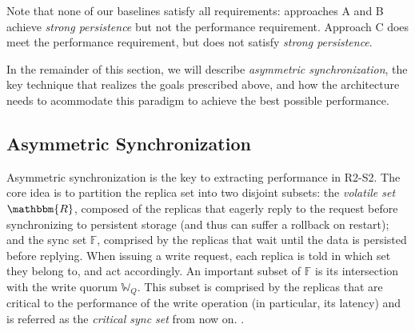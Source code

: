 Note that none of our baselines satisfy all requirements:
approaches A and B achieve
\emph{strong persistence} but not the performance requirement.
Approach C does meet the performance
requirement, but does not satisfy \emph{strong persistence}.

In the remainder of this section, we will describe
\emph{asymmetric synchronization}, the key technique that realizes the
goals prescribed above, and how the architecture needs to
acommodate this paradigm to achieve the best possible
performance.

\subsection{Asymmetric Synchronization}\label{ssec:asymmetric_synchronization}

Asymmetric synchronization is the key to extracting performance
in \ac{R2-S2}. The core idea is to partition the replica set
into two disjoint subsets: the \emph{volatile set}
$\mathbbm{R}$, composed of the replicas that eagerly reply to the
request before synchronizing to persistent storage (and thus can
suffer a rollback on restart); and the sync set $\mathbb{F}$,
comprised by the
replicas that wait until the data is persisted before replying.
When issuing a write request, each replica is told in which set
they belong to, and act accordingly. An important subset of
$\mathbb{F}$ is its intersection with the write quorum
$\mathbb{W}_Q$. This subset is comprised by the replicas that are
critical to the performance of the write operation (in
particular, its latency) and is referred as the \emph{critical
sync set} from now on. .

